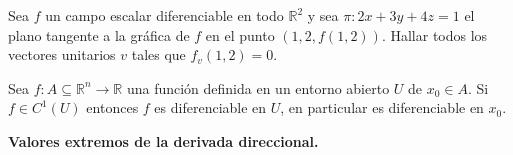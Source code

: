 \begin{tarea}
Sea  $f$  un  campo escalar  diferenciable  en todo  $\mathbb{R}^{2}$  y sea   $\pi:  2x+3y+4z=1$   el plano tangente a la gr\'afica de $f$  en el punto $(1,2, f(1,2)).$    Hallar todos los vectores unitarios $v$ tales que $f_v(1,2) = 0.$
\end{tarea}


\begin{theorem} Sea  $f: A\subseteq \mathbb{R}^n \to \mathbb{R}$ una función definida en un entorno abierto $U$ de $x_0 \in A$. 
Si $f \in C^1(U)$   entonces $f$ es diferenciable en $U$, en particular es diferenciable en $x_0.$
\end{theorem}

\begin{theorem}\textbf{Valores extremos de la derivada direccional.} \label{teo:max_deriv}
\mbox{}


\end{theorem}
